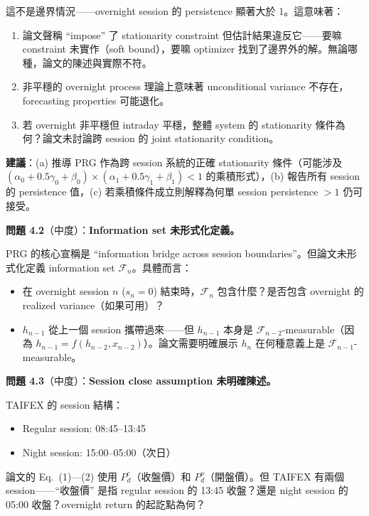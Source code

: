 \documentclass[12pt,a4paper]{article}
\begin{document}
這不是邊界情況——overnight session 的 persistence 顯著大於 1。這意味著：
\begin{enumerate}
    \item 論文聲稱 ``impose'' 了 stationarity constraint 但估計結果違反它——要嘛 constraint 未實作（soft bound），要嘛 optimizer 找到了邊界外的解。無論哪種，論文的陳述與實際不符。
    \item 非平穩的 overnight process 理論上意味著 unconditional variance 不存在，forecasting properties 可能退化。
    \item 若 overnight 非平穩但 intraday 平穩，整體 system 的 stationarity 條件為何？論文未討論跨 session 的 joint stationarity condition。
\end{enumerate}

\textbf{建議}：(a) 推導 PRG 作為跨 session 系統的正確 stationarity 條件（可能涉及 $(\alpha_0+0.5\gamma_0+\beta_0) \times (\alpha_1+0.5\gamma_1+\beta_1) < 1$ 的乘積形式），(b) 報告所有 session 的 persistence 值，(c) 若乘積條件成立則解釋為何單 session persistence $>1$ 仍可接受。

\textbf{問題 4.2}（\textcolor{warncolor}{中度}）：\textbf{Information set 未形式化定義。}

PRG 的核心宣稱是 ``information bridge across session boundaries''。但論文未形式化定義 information set $\mathcal{F}_n$。具體而言：
\begin{itemize}
    \item 在 overnight session $n$ ($s_n = 0$) 結束時，$\mathcal{F}_n$ 包含什麼？是否包含 overnight 的 realized variance（如果可用）？
    \item $h_{n-1}$ 從上一個 session 攜帶過來——但 $h_{n-1}$ 本身是 $\mathcal{F}_{n-2}$-measurable（因為 $h_{n-1} = f(h_{n-2}, x_{n-2})$）。論文需要明確展示 $h_n$ 在何種意義上是 $\mathcal{F}_{n-1}$-measurable。
\end{itemize}

\textbf{問題 4.3}（\textcolor{warncolor}{中度}）：\textbf{Session close assumption 未明確陳述。}

TAIFEX 的 session 結構：
\begin{itemize}
    \item Regular session: 08:45--13:45
    \item Night session: 15:00--05:00（次日）
\end{itemize}

論文的 Eq.\ (1)---(2) 使用 $P^c_d$（收盤價）和 $P^o_d$（開盤價）。但 TAIFEX 有兩個 session——``收盤價'' 是指 regular session 的 13:45 收盤？還是 night session 的 05:00 收盤？overnight return 的起訖點為何？
\end{document}
